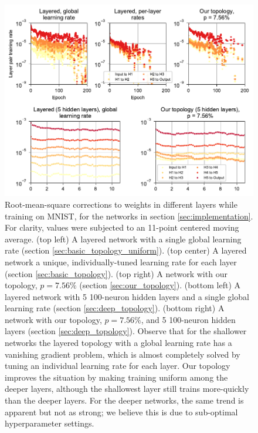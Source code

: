 \documentclass[utf8]{frontiersSCNS}
\begin{document}
\begin{figure}[h!]
\begin{center}
\includegraphics[width=\columnwidth]{figures/MNIST_individual_layers.pdf}
\end{center}
\caption{Root-mean-square corrections to weights in different layers while training on MNIST, for the networks in section \ref{sec:implementation}. For clarity, values were subjected to an 11-point centered moving average. (top left) A layered network with a single global learning rate (section \ref{sec:basic_topology_uniform}). (top center) A layered network a unique, individually-tuned learning rate for each layer (section \ref{sec:basic_topology}).  (top right) A network with our topology, $p = 7.56\%$ (section \ref{sec:our_topology}). (bottom left) A layered network with 5 100-neuron hidden layers and a single global learning rate (section \ref{sec:deep_topology}). (bottom right) A network with our topology, $p=7.56\%$, and 5 100-neuron hidden layers (section \ref{sec:deep_topology}). Observe that for the shallower networks the layered topology with a global learning rate has a vanishing gradient problem, which is almost completely solved by tuning an individual learning rate for each layer. Our topology improves the situation by making training uniform among the deeper layers, although the shallowest layer still trains more-quickly than the deeper layers. For the deeper networks, the same trend is apparent but not as strong; we believe this is due to sub-optimal hyperparameter settings.}   \label{fig:mnist_layers}
\end{figure}
\end{document}
